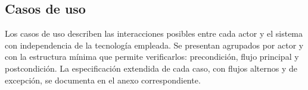 	\normalsize
	\setlength{\tabcolsep}{6pt}
	\renewcommand{\arraystretch}{1}
	
	\subsection{Casos de uso}
	\label{sec:casos_uso}
	Los casos de uso describen las interacciones posibles entre cada actor y el sistema con
	independencia de la tecnología empleada. Se presentan agrupados por actor y con la estructura
	mínima que permite verificarlos: precondición, flujo principal y postcondición. La especificación
	extendida de cada caso, con flujos alternos y de excepción, se documenta en el anexo
	correspondiente.
	
	\small
	\renewcommand{\arraystretch}{1.2}
	\setlength{\tabcolsep}{4pt}
	
